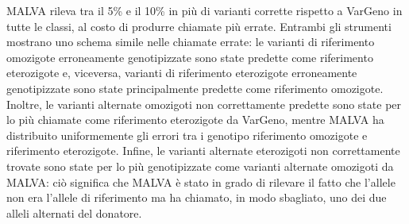 \documentclass[../main.tex]{subfiles}
\begin{document}
MALVA rileva tra il 5\% e il 10\% in più di  varianti corrette rispetto a VarGeno in tutte le classi, al costo di produrre chiamate più errate. Entrambi gli strumenti mostrano uno schema simile nelle chiamate errate: le varianti di riferimento omozigote erroneamente genotipizzate sono state predette come riferimento eterozigote e, viceversa, varianti di riferimento eterozigote erroneamente genotipizzate sono state principalmente predette come riferimento omozigote. Inoltre, le varianti alternate omozigoti non correttamente predette sono state per lo più chiamate come riferimento eterozigote da VarGeno, mentre MALVA ha distribuito uniformemente gli errori tra i genotipo riferimento omozigote e riferimento eterozigote. Infine, le varianti alternate eterozigoti non correttamente trovate sono state per lo più genotipizzate come varianti alternate omozigoti da MALVA: ciò significa che MALVA  è stato in grado di rilevare il fatto che l'allele non era l'allele di riferimento ma ha chiamato, in modo sbagliato, uno dei due alleli alternati del donatore. 
\end{document}
